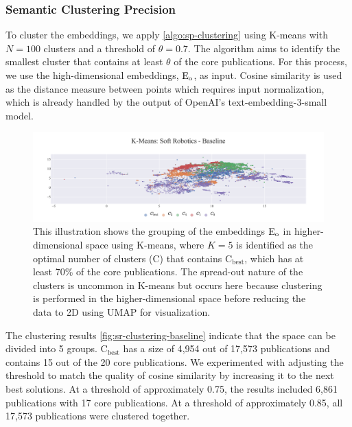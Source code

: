 \subsubsection{Semantic Clustering Precision}

To cluster the embeddings, we apply \autoref{algo:sp-clustering} using K-means with \( N = 100 \) clusters and a threshold of \( \theta = 0.7 \). The algorithm aims to identify the smallest cluster that contains at least $\theta$ of the core publications. For this process, we use the high-dimensional embeddings, $\mathop{}\!\mathrm{E_{o}}$, as input. Cosine similarity is used as the distance measure between points which requires input normalization, which is already handled by the output of OpenAI's text-embedding-3-small model.

\begin{figure}[!hb]
	\hspace*{-1cm}	
	\includegraphics[scale=0.45]{pics/sr-clustering-baseline.pdf}
	\caption[Semantic Clustering: Soft Robotics]{This illustration shows the grouping of the embeddings $\mathop{}\!\mathrm{E_{o}}$ in higher-dimensional space using K-means, where $K=5$ is identified as the optimal number of clusters (C) that contains $\text{C}_{\text{best}}$, which has at least 70\% of the core publications. The spread-out nature of the clusters is uncommon in K-means but occurs here because clustering is performed in the higher-dimensional space before reducing the data to 2D using UMAP for visualization.}\label{fig:sr-clustering-baseline}
\end{figure}

The clustering results \autoref{fig:sr-clustering-baseline} indicate that the space can be divided into 5 groups. $\text{C}_{\text{best}}$ has a size of 4,954 out of 17,573 publications and contains 15 out of the 20 core publications. We experimented with adjusting the threshold to match the quality of cosine similarity by increasing it to the next best solutions. At a threshold of approximately 0.75, the results included 6,861 publications with 17 core publications. At a threshold of approximately 0.85, all 17,573 publications were clustered together.

